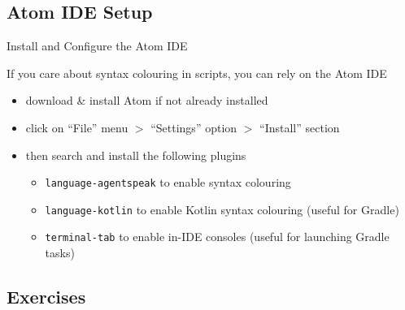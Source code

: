 \documentclass[presentation]{beamer}\mode<presentation>{\usetheme{AMSBolognaFC}}
\begin{document}
\subsection{Atom IDE Setup}

\begin{frame}[c]{Install and Configure the Atom IDE}
    
    If you care about syntax colouring in \jason{} scripts, you can rely on the Atom IDE
    \vfill
    \begin{itemize}
        \item download \& install Atom if not already installed
        \begin{center}
        \end{center}
        
        \vfill
        
        \item click on \alert{``File'' menu $>$ ``Settings'' option $>$ ``Install'' section }
        
        \vfill
        
        \item then search and install the following plugins
        \begin{itemize}
            \item \alert{\texttt{language-agentspeak}} to enable \jason{} syntax colouring
            \item \alert{\texttt{language-kotlin}} to enable Kotlin syntax colouring (useful for Gradle)
            \item \alert{\texttt{terminal-tab}} to enable in-IDE consoles (useful for launching Gradle tasks)
        \end{itemize}
    \end{itemize}
    
\end{frame}

\subsection{\jason{} Exercises}
\end{document}
